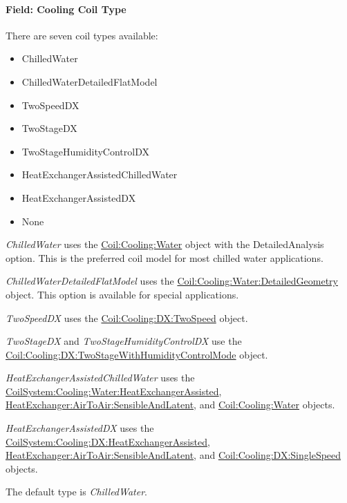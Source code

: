 \paragraph{Field: Cooling Coil Type}\label{field-cooling-coil-type-12}

There are seven coil types available:

\begin{itemize}
\item
  ChilledWater
\item
  ChilledWaterDetailedFlatModel
\item
  TwoSpeedDX
\item
  TwoStageDX
\item
  TwoStageHumidityControlDX
\item
  HeatExchangerAssistedChilledWater
\item
  HeatExchangerAssistedDX
\item
  None
\end{itemize}

\emph{ChilledWater} uses the \hyperref[coilcoolingwater]{Coil:Cooling:Water} object with the DetailedAnalysis option. This is the preferred coil model for most chilled water applications.

\emph{ChilledWaterDetailedFlatModel} uses the \hyperref[coilcoolingwaterdetailedgeometry]{Coil:Cooling:Water:DetailedGeometry} object. This option is available for special applications.

\emph{TwoSpeedDX} uses the \hyperref[coilcoolingdxtwospeed]{Coil:Cooling:DX:TwoSpeed} object.

\emph{TwoStageDX} and \emph{TwoStageHumidityControlDX} use the \hyperref[coilcoolingdxtwostagewithhumiditycontrolmode]{Coil:Cooling:DX:TwoStageWithHumidityControlMode} object.

\emph{HeatExchangerAssistedChilledWater} uses the \hyperref[coilsystemcoolingwaterheatexchangerassisted]{CoilSystem:Cooling:Water:HeatExchangerAssisted}, \hyperref[heatexchangerairtoairsensibleandlatent]{HeatExchanger:AirToAir:SensibleAndLatent}, and \hyperref[coilcoolingwater]{Coil:Cooling:Water} objects.

\emph{HeatExchangerAssistedDX} uses the \hyperref[coilsystemcoolingdxheatexchangerassisted]{CoilSystem:Cooling:DX:HeatExchangerAssisted}, \hyperref[heatexchangerairtoairsensibleandlatent]{HeatExchanger:AirToAir:SensibleAndLatent}, and \hyperref[coilcoolingdxsinglespeed]{Coil:Cooling:DX:SingleSpeed} objects.

The default type is \emph{ChilledWater}.

